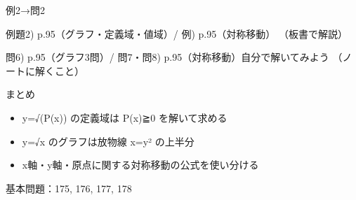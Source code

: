 \documentclass[aspectratio=43,professionalfonts,handout]{beamer}
\begin{document}
\begin{frame}{例2→問2}
  \begin{exampleblock}{例題2) p.95（グラフ・定義域・値域）/ 例) p.95（対称移動）}
    （板書で解説）
  \end{exampleblock}

  \vfill

  \begin{block}{問6) p.95（グラフ3問）/ 問7・問8) p.95（対称移動）\quad 自分で解いてみよう}
    （ノートに解くこと）
  \end{block}
\end{frame}

\begin{frame}{まとめ}
  \begin{itemize}
    \item y=√(P(x)) の定義域は P(x)≧0 を解いて求める
    \item y=√x のグラフは放物線 x=y² の上半分
    \item x軸・y軸・原点に関する対称移動の公式を使い分ける
  \end{itemize}

  \vfill
  {\small 基本問題：175, 176, 177, 178}
\end{frame}
\end{document}
